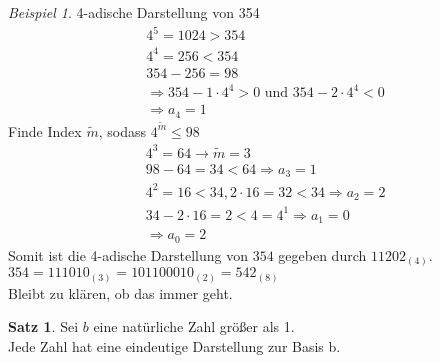 \documentclass[12pt,a4paper,titlepage]{article} %
\theoremstyle{definition}
\newtheorem{satz}{Satz}[subsection]
\theoremstyle{remark}
\newtheorem*{bsp}{Beispiel}
\begin{document}
	\begin{bsp}
		4-adische Darstellung von 354\\
		\begin{align*}			
			&4^5 = 1024 > 354\\
			&4^4 = 256 < 354\\
			&354 - 256 = 98\\
			&\Rightarrow 354 -1 \cdot 4^4 > 0 \text{ und } 354 - 2 \cdot 4^4 < 0\\
			&\Rightarrow a_4 = 1
		\end{align*}
		Finde Index \(\tilde{m}\), sodass \(4^{\tilde{m}} \leq 98\)			
		\begin{align*}			
			&4^3 = 64 \rightarrow \tilde{m} = 3\\
			&98 - 64 = 34 < 64 \Rightarrow a_3 = 1\\
			&4^2 = 16 < 34, 2 \cdot 16 = 32 < 34 \Rightarrow a_2 = 2\\
			&34 - 2 \cdot 16 = 2 < 4 = 4^1 \Rightarrow a_1 = 0\\
			&\Rightarrow a_0 = 2
		\end{align*}
		Somit ist die 4-adische Darstellung von \(354\) gegeben durch \(11202_{(4)}\).\\
		\(354 = 111010_{(3)} = 101100010_{(2)} = 542_{(8)}\)\\
		Bleibt zu klären, ob das immer geht.
	\end{bsp}
	\begin{satz}
		Sei \(b\) eine natürliche Zahl größer als 1.\\
		Jede Zahl hat eine eindeutige Darstellung zur Basis b.
	\end{satz}
\end{document}
